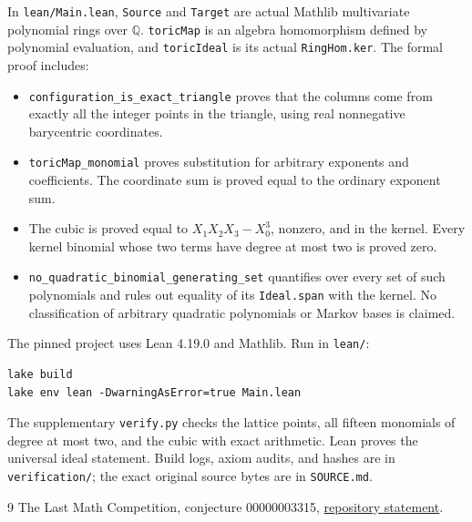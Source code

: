 \documentclass[11pt]{article}
\begin{document}
In \texttt{lean/Main.lean}, \texttt{Source} and \texttt{Target} are actual
Mathlib multivariate polynomial rings over $\mathbb Q$.
\texttt{toricMap} is an algebra homomorphism defined by polynomial
evaluation, and \texttt{toricIdeal} is its actual \texttt{RingHom.ker}.
The formal proof includes:
\begin{itemize}
\item \texttt{configuration\_is\_exact\_triangle} proves that the columns
come from exactly all the integer points in the triangle, using real
nonnegative barycentric coordinates.
\item \texttt{toricMap\_monomial} proves substitution for arbitrary
exponents and coefficients. The coordinate sum is proved equal to the
ordinary exponent sum.
\item The cubic is proved equal to $X_1X_2X_3-X_0^3$, nonzero, and in
the kernel. Every kernel binomial whose two terms have degree at most
two is proved zero.
\item \texttt{no\_quadratic\_binomial\_generating\_set} quantifies over
every set of such polynomials and rules out equality of its
\texttt{Ideal.span} with the kernel. No classification of arbitrary
quadratic polynomials or Markov bases is claimed.
\end{itemize}
The pinned project uses Lean 4.19.0 and Mathlib. Run in \texttt{lean/}:
\begin{verbatim}
lake build
lake env lean -DwarningAsError=true Main.lean
\end{verbatim}
The supplementary \texttt{verify.py} checks the lattice points, all
fifteen monomials of degree at most two, and the cubic with exact
arithmetic. Lean proves the universal ideal statement. Build logs, axiom
audits, and hashes are in \texttt{verification/}; the exact original
source bytes are in \texttt{SOURCE.md}.

\small
\begin{thebibliography}{9}
 The Last Math Competition, conjecture 00000003315,
\href{https://github.com/The-Last-Math-Competition/The-Last-Math-Competition/blob/main/conjectures/00000003315.md}{repository statement}.
\end{thebibliography}
\end{document}
